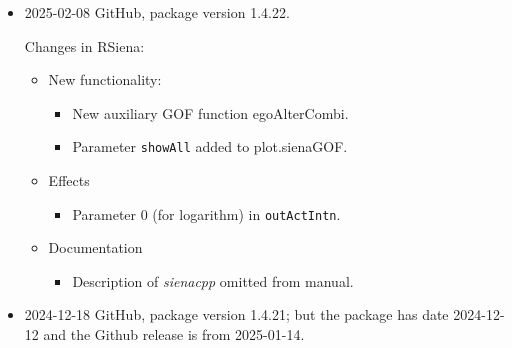 \documentclass[a4paper,fleqn,11pt]{article}
\newcommand{\+}{\, + \,}
\newcommand{\sfn}[1]{\textsf{#1}}
\begin{document}
\begin{small}
\begin{itemize}
\item 2025-02-08 GitHub, package version 1.4.22.

Changes in RSiena:
\begin{itemize}
\item New functionality:
   \begin{itemize}
   \item New auxiliary GOF function \sfn{egoAlterCombi}.
   \item Parameter \texttt{showAll} added to  \sfn{plot.sienaGOF}.
    \end{itemize}
\item  Effects
   \begin{itemize}
	\item Parameter 0 (for logarithm) in \texttt{outActIntn}.
    \end{itemize}
\item Documentation
   \begin{itemize}
	\item Description of \textit{sienacpp} omitted from manual.
    \end{itemize}
\end{itemize}

\item 2024-12-18 GitHub, package version 1.4.21;
   but the package has date 2024-12-12 and the Github release is from 2025-01-14.


\end{itemize}
\end{small}
\end{document}
